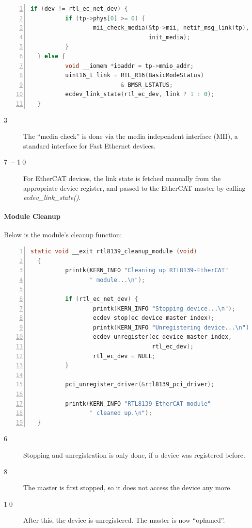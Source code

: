 \documentclass[a4paper,12pt,BCOR6mm,bibtotoc,idxtotoc]{scrbook}
\begin{document}
\begin{lstlisting}[language=C,numbers=left]
  if (dev != rtl_ec_net_dev) {
          if (tp->phys[0] >= 0) {
                  mii_check_media(&tp->mii, netif_msg_link(tp),
                                  init_media);
          }
  } else {
          void __iomem *ioaddr = tp->mmio_addr;
          uint16_t link = RTL_R16(BasicModeStatus)
                          & BMSR_LSTATUS;
          ecdev_link_state(rtl_ec_dev, link ? 1 : 0);
  }
\end{lstlisting}

\begin{description}
\item[\normalfont\textcircled{\tiny 3}] The ``media check'' is done
  via the media independent interface (MII), a standard interface for Fast Ethernet
  devices.
\item[\normalfont\textcircled{\tiny 7} -- \textcircled{\tiny 10}] For
  EtherCAT devices, the link state is fetched manually from the
  appropriate device register, and passed to the EtherCAT master by
  calling \textit{ecdev\_\-link\_\-state()}.
\end{description}

\paragraph{Module Cleanup}

Below is the module's cleanup function:

\begin{lstlisting}[language=C,numbers=left]
  static void __exit rtl8139_cleanup_module (void)
  {
          printk(KERN_INFO "Cleaning up RTL8139-EtherCAT"
                 " module...\n");

          if (rtl_ec_net_dev) {
                  printk(KERN_INFO "Stopping device...\n");
                  ecdev_stop(ec_device_master_index);
                  printk(KERN_INFO "Unregistering device...\n");
                  ecdev_unregister(ec_device_master_index,
                                   rtl_ec_dev);
                  rtl_ec_dev = NULL;
          }

          pci_unregister_driver(&rtl8139_pci_driver);

          printk(KERN_INFO "RTL8139-EtherCAT module"
                 " cleaned up.\n");
  }
\end{lstlisting}

\begin{description}
\item[\normalfont\textcircled{\tiny 6}] Stopping and unregistration is
  only done, if a device was registered before.
\item[\normalfont\textcircled{\tiny 8}] The master is first stopped,
  so it does not access the device any more.
\item[\normalfont\textcircled{\tiny 10}] After this, the device is
  unregistered. The master is now ``ophaned''.
\end{description}
\end{document}
